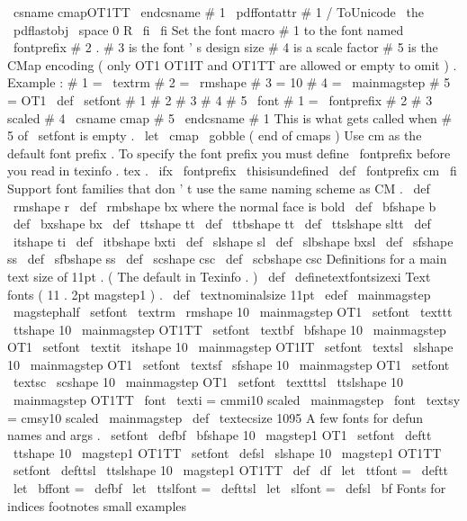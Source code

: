 {{{\
csname
cmapOT1TT
\
endcsname
#
1
{
%
\
pdffontattr
#
1
{
/
ToUnicode
\
the
\
pdflastobj
\
space
0
R
}
%
}
%
\
fi
\
fi
%
Set
the
font
macro
#
1
to
the
font
named
\
fontprefix
#
2
.
%
#
3
is
the
font
'
s
design
size
#
4
is
a
scale
factor
#
5
is
the
CMap
%
encoding
(
only
OT1
OT1IT
and
OT1TT
are
allowed
or
empty
to
omit
)
.
%
Example
:
%
#
1
=
\
textrm
%
#
2
=
\
rmshape
%
#
3
=
10
%
#
4
=
\
mainmagstep
%
#
5
=
OT1
%
\
def
\
setfont
#
1
#
2
#
3
#
4
#
5
{
%
\
font
#
1
=
\
fontprefix
#
2
#
3
scaled
#
4
\
csname
cmap
#
5
\
endcsname
#
1
%
}
%
This
is
what
gets
called
when
#
5
of
\
setfont
is
empty
.
\
let
\
cmap
\
gobble
%
%
(
end
of
cmaps
)
%
Use
cm
as
the
default
font
prefix
.
%
To
specify
the
font
prefix
you
must
define
\
fontprefix
%
before
you
read
in
texinfo
.
tex
.
\
ifx
\
fontprefix
\
thisisundefined
\
def
\
fontprefix
{
cm
}
\
fi
%
Support
font
families
that
don
'
t
use
the
same
naming
scheme
as
CM
.
\
def
\
rmshape
{
r
}
\
def
\
rmbshape
{
bx
}
%
where
the
normal
face
is
bold
\
def
\
bfshape
{
b
}
\
def
\
bxshape
{
bx
}
\
def
\
ttshape
{
tt
}
\
def
\
ttbshape
{
tt
}
\
def
\
ttslshape
{
sltt
}
\
def
\
itshape
{
ti
}
\
def
\
itbshape
{
bxti
}
\
def
\
slshape
{
sl
}
\
def
\
slbshape
{
bxsl
}
\
def
\
sfshape
{
ss
}
\
def
\
sfbshape
{
ss
}
\
def
\
scshape
{
csc
}
\
def
\
scbshape
{
csc
}
%
Definitions
for
a
main
text
size
of
11pt
.
(
The
default
in
Texinfo
.
)
%
\
def
\
definetextfontsizexi
{
%
%
Text
fonts
(
11
.
2pt
magstep1
)
.
\
def
\
textnominalsize
{
11pt
}
\
edef
\
mainmagstep
{
\
magstephalf
}
\
setfont
\
textrm
\
rmshape
{
10
}
{
\
mainmagstep
}
{
OT1
}
\
setfont
\
texttt
\
ttshape
{
10
}
{
\
mainmagstep
}
{
OT1TT
}
\
setfont
\
textbf
\
bfshape
{
10
}
{
\
mainmagstep
}
{
OT1
}
\
setfont
\
textit
\
itshape
{
10
}
{
\
mainmagstep
}
{
OT1IT
}
\
setfont
\
textsl
\
slshape
{
10
}
{
\
mainmagstep
}
{
OT1
}
\
setfont
\
textsf
\
sfshape
{
10
}
{
\
mainmagstep
}
{
OT1
}
\
setfont
\
textsc
\
scshape
{
10
}
{
\
mainmagstep
}
{
OT1
}
\
setfont
\
textttsl
\
ttslshape
{
10
}
{
\
mainmagstep
}
{
OT1TT
}
\
font
\
texti
=
cmmi10
scaled
\
mainmagstep
\
font
\
textsy
=
cmsy10
scaled
\
mainmagstep
\
def
\
textecsize
{
1095
}
%
A
few
fonts
for
defun
names
and
args
.
\
setfont
\
defbf
\
bfshape
{
10
}
{
\
magstep1
}
{
OT1
}
\
setfont
\
deftt
\
ttshape
{
10
}
{
\
magstep1
}
{
OT1TT
}
\
setfont
\
defsl
\
slshape
{
10
}
{
\
magstep1
}
{
OT1TT
}
\
setfont
\
defttsl
\
ttslshape
{
10
}
{
\
magstep1
}
{
OT1TT
}
\
def
\
df
{
\
let
\
ttfont
=
\
deftt
\
let
\
bffont
=
\
defbf
\
let
\
ttslfont
=
\
defttsl
\
let
\
slfont
=
\
defsl
\
bf
}
%
Fonts
for
indices
footnotes
small
examples
}}}}
